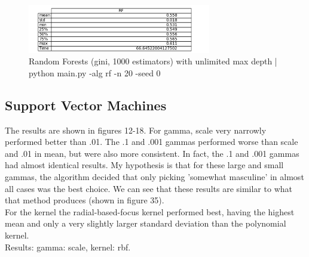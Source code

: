 \documentclass{article}
\begin{document}
\begin{figure}
\begin{center}
\includegraphics[width=8cm]{images/rf_dunlimited}
\caption{Random Forests (gini, 1000 estimators) with unlimited max depth | python main.py -alg rf -n 20 -seed 0}
\end{center}
\end{figure}

\subsection{Support Vector Machines}

The results are shown in figures 12-18. For gamma, scale very narrowly performed better than .01. The .1 and .001 gammas performed worse than scale and .01 in mean, but were also more consistent. In fact, the .1 and .001 gammas had almost identical results. My hypothesis is that for these large and small gammas, the algorithm decided that only picking 'somewhat masculine' in almost all cases was the best choice. We can see that these results are similar to what that method produces (shown in figure 35).\\

For the kernel the radial-based-focus kernel performed best, having the highest mean and only a very slightly larger standard deviation than the polynomial kernel.\\

Results: gamma: scale, kernel: rbf.
\end{document}
